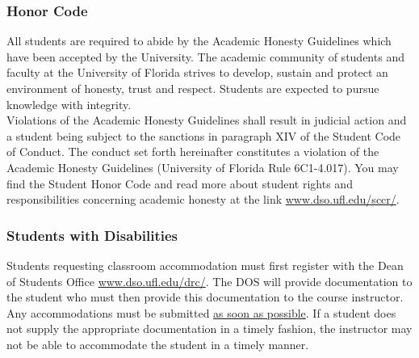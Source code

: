 \documentclass{ximera}
\begin{document}
\subsubsection*{Honor Code}
    All students are required to abide by the Academic Honesty Guidelines which have been accepted by the University. The academic community of students and faculty at the University of Florida strives to develop, sustain and protect an environment of honesty, trust and respect. Students are expected to pursue knowledge with integrity.\\

    \noindent Violations of the Academic Honesty Guidelines shall result in judicial action and a student being subject to the sanctions in paragraph XIV of the Student Code of Conduct. The conduct set forth hereinafter constitutes a violation of the Academic Honesty Guidelines (University of Florida Rule 6C1-4.017).  You may find the Student Honor Code and read more about student rights and responsibilities concerning academic honesty at the link \url{www.dso.ufl.edu/sccr/}.

\subsubsection*{Students with Disabilities}
    Students requesting classroom accommodation must first register with the Dean of Students Office \url{www.dso.ufl.edu/drc/}. The DOS will provide documentation to the student who must then provide this documentation to the course instructor. Any accommodations must be submitted \underline{as soon as possible}.  If a student does not supply the appropriate documentation in a timely fashion, the instructor may not be able to accommodate the student in a timely manner.     
    
\end{document}
